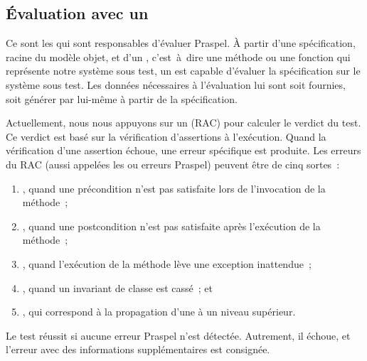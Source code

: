 \subsection{Évaluation avec un }
\label{subsection:tools:evaluation}

Ce sont les  qui sont responsables d'évaluer
Praspel. À partir d'une spécification, racine du modèle objet, et d'un
, c'est~à~dire une méthode ou une fonction qui représente
notre système sous test, un  est capable d'évaluer
la spécification sur le système sous test. Les données nécessaires à
l'évaluation lui sont soit fournies, soit générer par lui-même à partir de la
spécification.

Actuellement, nous nous appuyons sur un 
(RAC) pour calculer le verdict du test. Ce verdict est basé sur la vérification
d'assertions à l'exécution. Quand la vérification d'une assertion échoue, une
erreur spécifique est produite. Les erreurs du RAC (aussi appelées les
 ou erreurs Praspel) peuvent être de cinq sortes~:
%
\begin{enumerate}

\item {}, quand une précondition n'est pas
satisfaite lors de l'invocation de la méthode~;

\item {}, quand une postcondition n'est pas
satisfaite après l'exécution de la méthode~;

\item {}, quand l'exécution de la méthode lève une
exception inattendue~;

\item {}, quand un invariant de classe est cassé~; et

\item {}, qui correspond à la propagation
d'une  à un niveau supérieur.

\end{enumerate}
%
Le test réussit si aucune erreur Praspel n'est détectée. Autrement, il échoue,
et l'erreur avec des informations supplémentaires est consignée.

